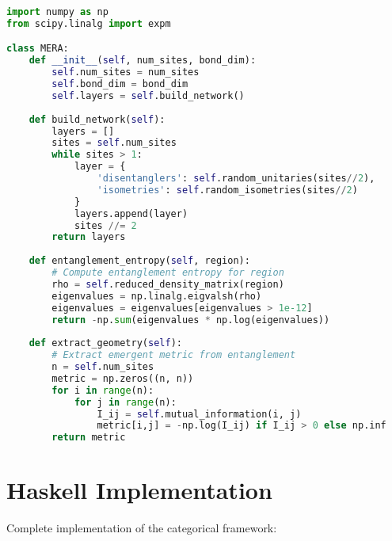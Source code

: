 \documentclass[12pt,a4paper]{article}
\theoremstyle{plain}
\theoremstyle{definition}
\theoremstyle{remark}
\begin{document}
\begin{lstlisting}[language=Python, basicstyle=\small]
import numpy as np
from scipy.linalg import expm

class MERA:
    def __init__(self, num_sites, bond_dim):
        self.num_sites = num_sites
        self.bond_dim = bond_dim
        self.layers = self.build_network()
    
    def build_network(self):
        layers = []
        sites = self.num_sites
        while sites > 1:
            layer = {
                'disentanglers': self.random_unitaries(sites//2),
                'isometries': self.random_isometries(sites//2)
            }
            layers.append(layer)
            sites //= 2
        return layers
    
    def entanglement_entropy(self, region):
        # Compute entanglement entropy for region
        rho = self.reduced_density_matrix(region)
        eigenvalues = np.linalg.eigvalsh(rho)
        eigenvalues = eigenvalues[eigenvalues > 1e-12]
        return -np.sum(eigenvalues * np.log(eigenvalues))
    
    def extract_geometry(self):
        # Extract emergent metric from entanglement
        n = self.num_sites
        metric = np.zeros((n, n))
        for i in range(n):
            for j in range(n):
                I_ij = self.mutual_information(i, j)
                metric[i,j] = -np.log(I_ij) if I_ij > 0 else np.inf
        return metric
\end{lstlisting}

\section{Haskell Implementation}

Complete implementation of the categorical framework:
\end{document}
